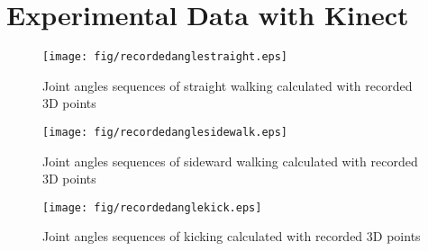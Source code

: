 \section{Experimental Data with Kinect}
\label{recordedangle}

\begin{figure}[H]
	\centering
	\texttt{[image: fig/recordedanglestraight.eps]}
	\caption{Joint angles sequences of straight walking calculated with recorded 3D points}
	\label{recordedanglestraight}
\end{figure}


\begin{figure}[H]
	\centering
	\texttt{[image: fig/recordedanglesidewalk.eps]}
	\caption{Joint angles sequences of sideward walking calculated with recorded 3D points}
	\label{recordedangleside}
\end{figure}

\begin{figure}[H]
	\centering
	\texttt{[image: fig/recordedanglekick.eps]}
	\caption{Joint angles sequences of kicking calculated with recorded 3D points}
	\label{recordedanglekick}
\end{figure}